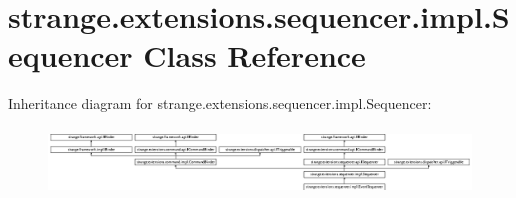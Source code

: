\hypertarget{classstrange_1_1extensions_1_1sequencer_1_1impl_1_1_sequencer}{\section{strange.\-extensions.\-sequencer.\-impl.\-Sequencer Class Reference}
\label{classstrange_1_1extensions_1_1sequencer_1_1impl_1_1_sequencer}
}
Inheritance diagram for strange.\-extensions.\-sequencer.\-impl.\-Sequencer\-:\begin{figure}[H]
\begin{center}
\leavevmode
\includegraphics[height=1.800643cm]{classstrange_1_1extensions_1_1sequencer_1_1impl_1_1_sequencer}
\end{center}
\end{figure}
